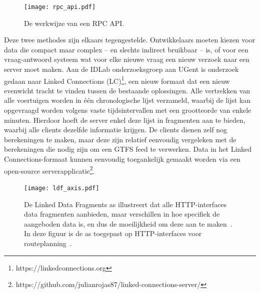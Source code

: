 \begin{figure}
	\centering
	\texttt{[image: rpc\_api.pdf]}
	\caption[RPC structuur]{De werkwijze van een RPC API.}
	\label{fig:rpcScheme}
\end{figure}

Deze twee methodes zijn elkaars tegengestelde. Ontwikkelaars moeten kiezen voor data die compact maar complex -- en slechts indirect bruikbaar -- is, of voor een vraag-antwoord systeem wat voor elke nieuwe vraag een nieuw verzoek naar een server moet maken. Aan de IDLab onderzoeksgroep aan UGent is onderzoek gedaan naar Linked Connections (LC)\footnote{https://linkedconnections.org}, een nieuw formaat dat een nieuw evenwicht tracht te vinden tussen de bestaande oplossingen. Alle vertrekken van alle voertuigen worden in één chronologische lijst verzameld, waarbij de lijst kan opgevraagd worden volgens vaste tijdsintervallen met een grootteorde van enkele minuten. Hierdoor hoeft de server enkel deze lijst in fragmenten aan te bieden, waarbij alle clients dezelfde informatie krijgen. De clients dienen zelf nog berekeningen te maken, maar deze zijn relatief eenvoudig vergeleken met de berekeningen die nodig zijn om een GTFS feed te verwerken. Data in het Linked Connections-formaat kunnen eenvoudig toegankelijk gemaakt worden via een open-source serverapplicatie\footnote{https://github.com/julianrojas87/linked-connections-server/}.

\begin{figure}
	\centering
		\texttt{[image: ldf\_axis.pdf]}
	\caption[Routeplanning HTTP-interfaces op de LDF as]{De Linked Data Fragments as illustreert dat alle HTTP-interfaces data fragmenten aanbieden, maar verschillen in hoe specifiek de aangeboden data is, en dus de moeilijkheid om deze aan te maken~\citep{verborgh14}. In deze figuur is de as toegepast op HTTP-interfaces voor routeplanning~\citep{colpaert15}.}
	\label{fig:ldfAxis}
\end{figure}

